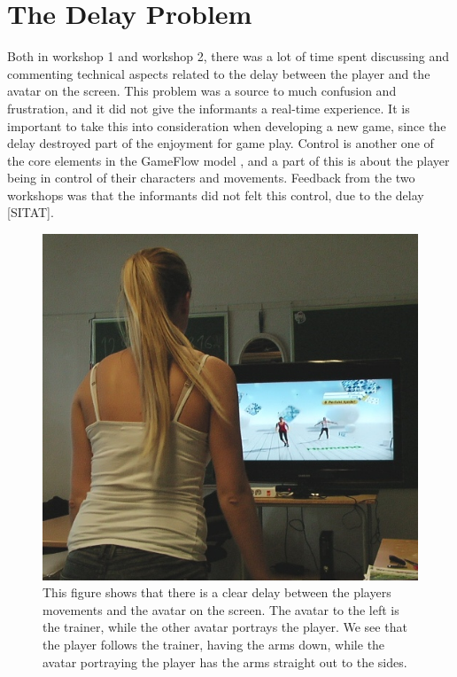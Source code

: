 \section{The Delay Problem}
\label{sec:delay}
Both in workshop 1 and workshop 2, there was a lot of time spent discussing and commenting technical aspects related to the delay between the player and the avatar on the screen. This problem was a source to much confusion and frustration, and it did not give the informants a real-time experience. It is important to take this into consideration when developing a new game, since the delay destroyed part of the enjoyment for game play. Control is another one of the core elements in the GameFlow model \cite{sweetser}, and a part of this is about the player being in control of their characters and movements. Feedback from the two workshops was that the informants did not felt this control, due to the delay [SITAT].  


\begin{figure} [H]
\centering
\includegraphics[scale=0.7]{kineDelay.jpg}
\caption[The Kinect sensor delay]{This figure shows that there is a clear delay between the players movements and the avatar on the screen. The avatar to the left is the trainer, while the other avatar portrays the player. We see that the player follows the trainer, having the arms down, while the avatar portraying the player has the arms straight out to the sides.}
\label{pickingapples}
\end{figure}

